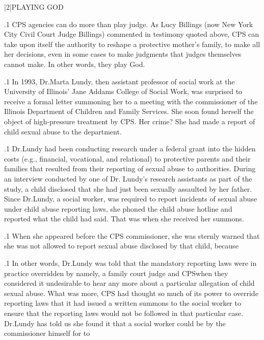 \documentclass[11pt, twoside]{article}
\begin{document}
{\s|2|{PLAYING GOD}

\p.1{%
\noindent{}CPS agencies can do more than play judge. As Lucy Billings (now New
York City Civil Court Judge Billings) commented in
testimony quoted above, CPS can take upon itself the authority to reshape a protective
mother's family, to make all her decisions, even in some cases to make
judgments that judges themselves cannot make. In other words, they
play God.
}%

\p.1{%
In 1993, Dr.\@ Marta Lundy, then assistant professor of social work at
the University of Illinois' Jane Addams College of Social Work, was surprised to receive a formal letter summoning her to a meeting with the
commissioner of the Illinois Department of Children and Family Services. She soon found herself the object of high-pressure treatment by
CPS. Her crime? She had made a report of child sexual abuse to the
department.
}%

\p.1{%
Dr.\@ Lundy had been conducting research under a federal grant into
the hidden costs (e.g., financial, vocational, and relational) to protective
parents and their families that resulted from their reporting of sexual
abuse to authorities. During an interview conducted by one of Dr.\@
Lundy's research assistants as part of the study, a child disclosed that
she had just been sexually assaulted by her father.
Since Dr.\@ Lundy, a social worker, was required to report incidents of
sexual abuse under child abuse reporting laws, she phoned the child
abuse hotline and reported what the child had said. That was when she
received her summons.
}%

\p.1{%
When she appeared before the CPS commissioner, she was sternly
warned that she was not allowed to report sexual abuse disclosed
by that child, because 
}%

\p.1{%
In other words, Dr.\@ Lundy was told that the mandatory reporting
laws were in practice overridden by \mdash{}namely, a
family court judge and CPS\mdash{}when they considered it undesirable to
hear any more about a particular allegation of child sexual abuse. What
was more, CPS had thought so much of its power to override reporting laws that it had issued a written summons to the social worker to
ensure that the reporting laws would not be followed in that particular case. Dr.\@ Lundy has told us she found it  that a
social worker could be  by the commissioner himself for
 to 
}%

}
\end{document}
